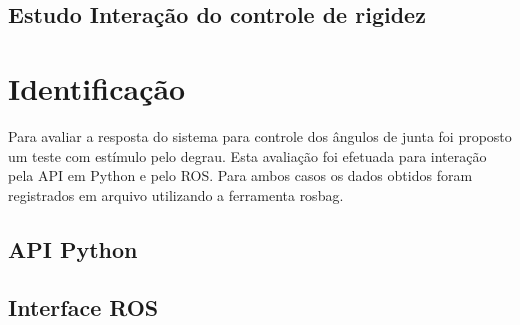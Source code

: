 
\subsection{Estudo Interação do controle de rigidez}

\section{Identificação}

Para avaliar a resposta do sistema para controle dos ângulos de junta foi proposto um teste com estímulo pelo degrau. Esta avaliação foi efetuada para interação pela API em Python e pelo ROS. Para ambos casos os dados obtidos foram registrados em arquivo utilizando a ferramenta rosbag. 


\subsection{API Python}

\subsection{Interface ROS}



